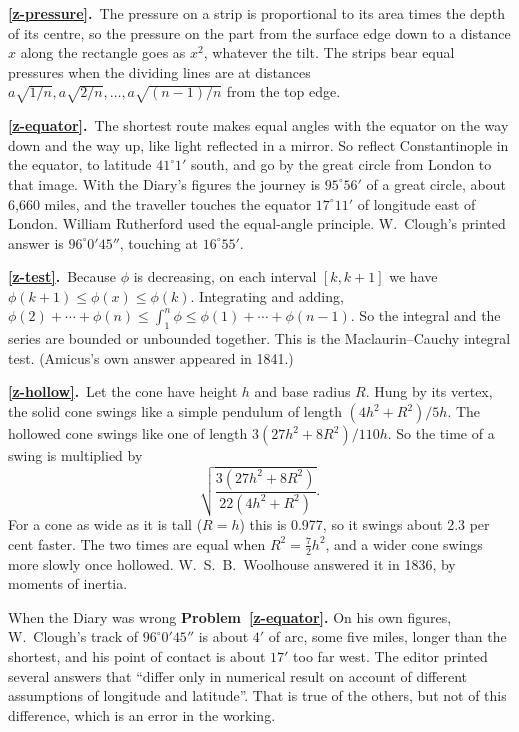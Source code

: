 \documentclass[11pt,a4paper]{article}
\newcommand{\ans}[2]{\par\smallskip\noindent\textbf{\ref{#1}.}\ #2}
\begin{document}
\ans{z-pressure}{The pressure on a strip is proportional to its area times the depth of its
centre, so the pressure on the part from the surface edge down to a distance $x$ along the
rectangle goes as $x^2$, whatever the tilt. The strips bear equal pressures when the
dividing lines are at distances $a\sqrt{1/n}, a\sqrt{2/n}, \dots, a\sqrt{(n-1)/n}$ from the
top edge.}

\ans{z-equator}{The shortest route makes equal angles with the equator on the way down and
the way up, like light reflected in a mirror. So reflect Constantinople in the equator, to
latitude $41^\circ1'$ south, and go by the great circle from London to that image. With the
Diary's figures the journey is $95^\circ56'$ of a great circle, about 6,660 miles, and the
traveller touches the equator $17^\circ11'$ of longitude east of London. William Rutherford
used the equal-angle principle. W.~Clough's printed answer is $96^\circ0'45''$, touching at
$16^\circ55'$.}

\ans{z-test}{Because $\phi$ is decreasing, on each interval $[k, k+1]$ we have
$\phi(k+1) \le \phi(x) \le \phi(k)$. Integrating and adding,
$\phi(2) + \cdots + \phi(n) \le \int_1^n\phi \le \phi(1) + \cdots + \phi(n-1)$. So the
integral and the series are bounded or unbounded together. This is the Maclaurin--Cauchy
integral test. (Amicus's own answer appeared in 1841.)}

\ans{z-hollow}{Let the cone have height $h$ and base radius $R$. Hung by its vertex, the
solid cone swings like a simple pendulum of length $(4h^2 + R^2)/5h$. The hollowed cone
swings like one of length $3(27h^2 + 8R^2)/110h$. So the time of a swing is multiplied by
\[ \sqrt{\frac{3(27h^2 + 8R^2)}{22(4h^2 + R^2)}}. \]
For a cone as wide as it is tall ($R = h$) this is 0.977, so it swings about 2.3 per cent
faster. The two times are equal when $R^2 = \tfrac72h^2$, and a wider cone swings more
slowly once hollowed. W.~S.~B.~Woolhouse answered it in 1836, by moments of inertia.}

\begin{diarynote}{When the Diary was wrong}
\textbf{Problem~\ref{z-equator}.} On his own figures, W.~Clough's track of
$96^\circ0'45''$ is about $4'$ of arc, some five miles, longer than the shortest, and his
point of contact is about $17'$ too far west. The editor printed several answers that
``differ only in numerical result on account of different assumptions of longitude and
latitude''. That is true of the others, but not of this difference, which is an error in
the working.
\end{diarynote}
\end{document}
